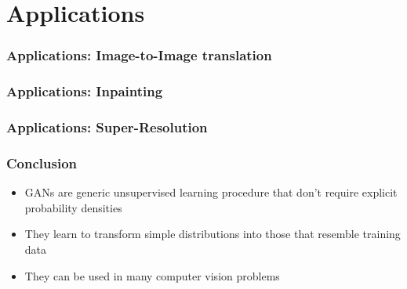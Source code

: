 \documentclass[10pt,mathserif]{beamer}
\begin{document}
\section{Applications}
\label{sec:applications}

\begin{frame}
  \frametitle{Applications: Image-to-Image translation}
\end{frame}

\begin{frame}
  \frametitle{Applications: Inpainting}
\end{frame}

\begin{frame}
  \frametitle{Applications: Super-Resolution}
\end{frame}

\begin{frame}
  \frametitle{Conclusion}
  \begin{itemize}
    \item GANs are generic unsupervised learning procedure that don't require
      explicit probability densities
    \item They learn to transform simple distributions into those that resemble training data
    \item They can be used in many computer vision problems
  \end{itemize}
\end{frame}
\end{document}
